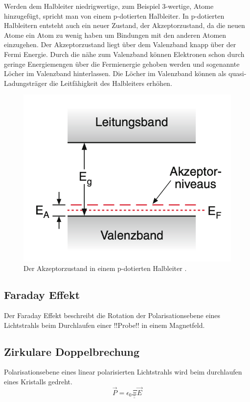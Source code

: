 Werden dem Halbleiter niedrigwertige, zum Beispiel 3-wertige, Atome hinzugefügt, spricht man von einem p-dotierten Halbleiter. In p-dotierten Halbleitern entsteht auch ein neuer Zustand, der Akzeptorzustand, da die neuen Atome ein Atom zu wenig haben um Bindungen mit den anderen Atomen einzugehen.
Der Akzeptorzustand liegt über dem Valenzband knapp über der Fermi Energie.
Durch die nähe zum Valenzband können Elektronen schon durch geringe Energiemengen über die Fermienergie gehoben werden und sogenannte Löcher im Valenzband hinterlassen.
Die Löcher im Valenzband können als quasi-Ladungsträger die Leitfähigkeit des Halbleiters erhöhen.
\begin{figure}[ht]
    \centering
    \includegraphics[scale = 0.5]{./bilder/p_Donatorschema_demtroeder.png}
    \caption{Der Akzeptorzustand in einem p-dotierten Halbleiter \cite{demtröder}.}
    \label{fig:p_donator}
\end{figure}

\subsection{Faraday Effekt}
Der Faraday Effekt beschreibt die Rotation der Polarisationsebene eines Lichtstrahls beim Durchlaufen einer !!Probe!! in einem Magnetfeld.

\subsection{Zirkulare Doppelbrechung}
Polarisationsebene eines linear polarisierten Lichtstrahls wird beim durchlaufen eines Kristalls gedreht.
\begin{equation}
    \vec{P} = \epsilon_0 \underline{\underline{\Xi}} \vec{E}
\end{equation}

